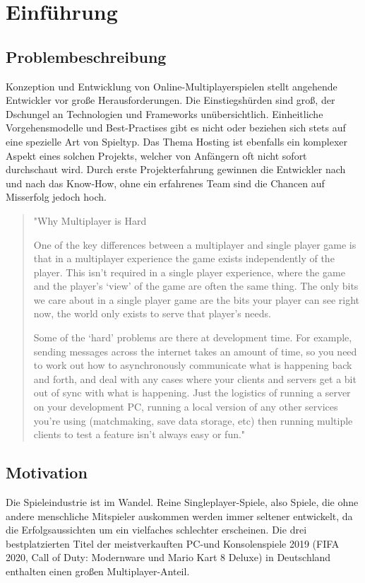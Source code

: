\chapter{Einführung}

\section{Problembeschreibung}

Konzeption und Entwicklung von Online-Multiplayerspielen stellt angehende Entwickler vor große Herausforderungen. Die Einstiegshürden sind groß, der Dschungel an Technologien und Frameworks unübersichtlich. Einheitliche Vorgehensmodelle und Best-Practises gibt es nicht oder beziehen sich stets auf eine spezielle Art von Spieltyp. Das Thema Hosting ist ebenfalls ein komplexer Aspekt eines solchen Projekts, welcher von Anfängern oft nicht sofort durchschaut wird. Durch erste Projekterfahrung gewinnen die Entwickler nach und nach das Know-How, ohne ein erfahrenes Team sind die Chancen auf Misserfolg jedoch hoch. 

\begin{quote}
	"Why Multiplayer is Hard
	
	One of the key differences between a multiplayer and single player game is that in a multiplayer experience the game exists independently of the player. This isn’t required in a single player experience, where the game and the player’s ‘view’ of the game are often the same thing. The only bits we care about in a single player game are the bits your player can see right now, the world only exists to serve that player’s needs.
	
	Some of the ‘hard’ problems are there at development time. For example, sending messages across the internet takes an amount of time, so you need to work out how to asynchronously communicate what is happening back and forth, and deal with any cases where your clients and servers get a bit out of sync with what is happening. Just the logistics of running a server on your development PC, running a local version of any other services you’re using (matchmaking, save data storage, etc) then running multiple clients to test a feature isn’t always easy or fun."
	 \cite{Payne.18.09.2019}
\end{quote}


\section{Motivation}
Die Spieleindustrie ist im Wandel. Reine Singleplayer-Spiele, also Spiele, die ohne andere menschliche Mitspieler auskommen werden immer seltener entwickelt, da die Erfolgsaussichten um ein vielfaches schlechter erscheinen. Die drei bestplatzierten Titel der meistverkauften PC-und Konsolenspiele 2019 (FIFA 2020, Call of Duty: Modernware und Mario Kart 8 Deluxe) in Deutschland enthalten einen großen Multiplayer-Anteil.\cite{gameVerbandderdeutschenGamesBranchee.V..2020}

